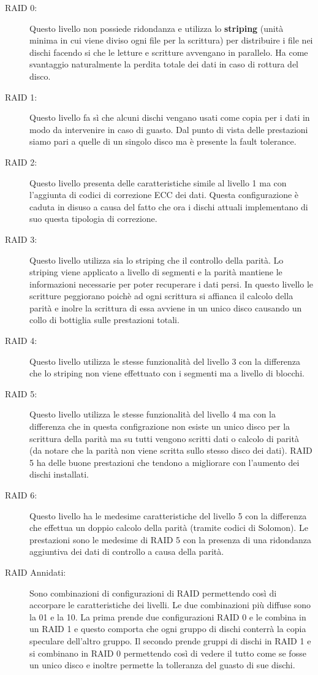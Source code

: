 \begin{description} 
  \item[RAID 0:]Questo livello non possiede ridondanza e utilizza lo \textbf{striping} (unità minima in cui viene diviso ogni file per la scrittura) per distribuire i file nei dischi facendo si che le letture e scritture avvengano in parallelo. Ha come svantaggio naturalmente la perdita totale dei dati in caso di rottura del disco.
  \item[RAID 1:]Questo livello fa sì che alcuni dischi vengano usati come copia per i dati in modo da intervenire in caso di guasto. Dal punto di vista delle prestazioni siamo pari a quelle di un singolo disco ma è presente la fault tolerance.
  \item[RAID 2:] Questo livello presenta delle caratteristiche simile al livello 1 ma con l'aggiunta di codici di correzione ECC dei dati. Questa configurazione è caduta in disuso a causa del fatto che ora i dischi attuali implementano di suo questa tipologia di correzione.
  \item[RAID 3:] Questo livello utilizza sia lo striping che il controllo della parità. Lo striping viene applicato a livello di segmenti e la parità mantiene le informazioni necessarie per poter recuperare i dati persi. In questo livello le scritture peggiorano poichè ad ogni scrittura si affianca il calcolo della parità e inolre la scrittura di essa avviene in un unico disco causando un collo di bottiglia sulle prestazioni totali.
  \item[RAID 4:] Questo livello utilizza le stesse funzionalità del livello 3 con la differenza che lo striping non viene effettuato con i segmenti ma a livello di blocchi.
  \item[RAID 5:] Questo livello utilizza le stesse funzionalità del livello 4 ma con la differenza che in questa configrazione non esiste un unico disco per la scrittura della parità ma su tutti vengono scritti dati o calcolo di parità (da notare che la parità non viene scritta sullo stesso disco dei dati). RAID 5 ha delle buone prestazioni che tendono a migliorare con l'aumento dei dischi installati.
  \item[RAID 6:] Questo livello ha le medesime caratteristiche del livello 5 con la differenza che effettua un doppio calcolo della parità (tramite codici di Solomon). Le prestazioni sono le medesime di RAID 5 con la presenza di una ridondanza aggiuntiva dei dati di controllo a causa della parità.
  \item[RAID Annidati:] Sono combinazioni di configurazioni di RAID permettendo così di accorpare le caratteristiche dei livelli. Le due combinazioni più diffuse sono la 01 e la 10. La prima prende due configurazioni RAID 0 e le combina in un RAID 1 e questo comporta che ogni gruppo di dischi conterrà la copia speculare dell'altro gruppo. Il secondo prende gruppi di dischi in RAID 1 e si combinano in RAID 0 permettendo così di vedere il tutto come se fosse un unico disco e inoltre permette la tolleranza del guasto di sue dischi.
\end{description}
